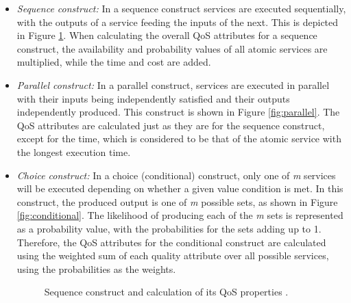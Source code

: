 \documentclass[conference]{IEEEtran}
\begin{document}
\begin{itemize}
\item \textit{Sequence construct:} In a sequence construct services are executed sequentially, with the outputs of a service feeding the inputs of the next. 
This is depicted in Figure \ref{fig:sequence}. When calculating the overall QoS attributes for a sequence construct, the availability and probability values of all atomic
services are multiplied, while the time and cost are added.

\item \textit{Parallel construct:} In a parallel construct, services are executed in parallel with their inputs being independently satisfied and their outputs 
independently produced. This construct is shown in Figure \ref{fig:parallel}. The QoS attributes are calculated just as they are for the sequence construct, except for the 
time, which is considered to be that of the atomic service with the longest execution time.

\item \textit{Choice construct:} In a choice (conditional) construct, only one of \textit{m} services will be executed depending on whether a given value condition is met. 
In this construct, the produced output is one of \textit{m} possible sets, as shown in Figure \ref{fig:conditional}. The likelihood of producing each of the \textit{m} sets is represented as
a probability value, with the probabilities for the sets adding up to 1. Therefore, the QoS attributes for the conditional construct are calculated using the
weighted sum of each quality attribute over all possible services, using the probabilities as the weights.

\begin{figure}
\centerline{
}
\caption{Sequence construct and calculation of its QoS properties
\cite{silva2014graph}.}
\label{fig:sequence}
\vspace{0.3cm}


\end{figure}
\end{itemize}
\end{document}

